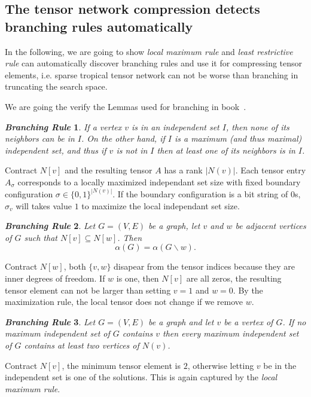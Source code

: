 \documentclass{article}
\newcommand{\<}{\langle}
\renewcommand{\>}{\rangle}
\renewcommand{\cite}[1]{{\citep{#1}}}
\newtheorem{theorem}{\textit{Branching Rule}}
\theoremstyle{definition}\newtheorem{definition}{\textit{Definition}}
\begin{document}
\subsection{The tensor network compression detects branching rules automatically}
In the following, we are going to show \textit{local maximum rule} and \textit{least restrictive rule} can automatically discover branching rules and use it for compressing tensor elements,
i.e. sparse tropical tensor network can not be worse than branching in truncating the search space.

We are going the verify the Lemmas used for branching in book~\cite{Fomin2013}.
\begin{theorem}\label{rule:one} %
  If a vertex $v$ is in an independent set $I$, then none of its neighbors can be in $I$.
On the other hand, if $I$ is a maximum (and thus maximal) independent set,
and thus if $v$ is not in $I$ then at least one of its neighbors is in $I$.
\end{theorem}

Contract $N[v]$ and the resulting tensor $A$ has a rank $|N(v)|$. Each tensor entry $A_{\sigma}$ corresponds to a locally maximized independant set size with fixed boundary configuration $\sigma \in \{0, 1\}^{|N(v)|}$.
If the boundary configuration is a bit string of 0s, $\sigma_v$ will takes value $1$ to maximize the local independant set size.

\begin{theorem} %
Let $G=(V,E)$ be a graph, let $v$ and $w$ be adjacent vertices of $G$ such that $N[v] \subseteq N[w]$. Then
\begin{equation}
\alpha(G)=\alpha(G\backslash w).
\end{equation}
\end{theorem}

Contract $N[w]$, both $\{v, w\}$ disapear from the tensor indices because they are inner degrees of freedom.
If $w$ is one, then $N[v]$ are all zeros, the resulting tensor element can not be larger than setting $v=1$ and $w=0$.
By the maximization rule, the local tensor does not change if we remove $w$.

\begin{theorem} %
  Let $G = (V, E)$ be a graph and let $v$ be a vertex of $G$. If no maximum
independent set of $G$ contains $v$ then every maximum independent set of $G$ contains
at least two vertices of $N(v)$.
\end{theorem}
Contract $N[v]$, the minimum tensor element is $2$, otherwise letting $v$ be in the independent set is one of the solutions. This is again captured by the \textit{local maximum rule}.
\end{document}
